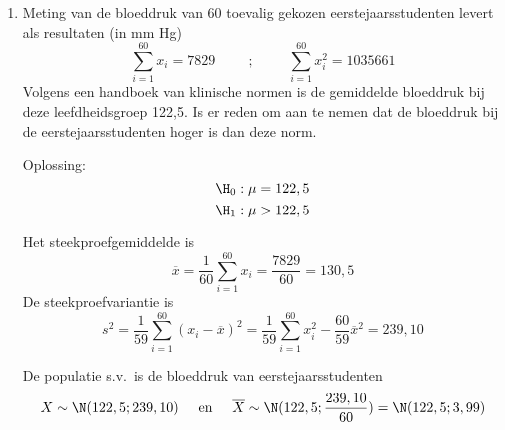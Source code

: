 {\begin{enumerate}
\begin{itemize}
\item Wat is de kans om, als de nulhypothese waar is, waarden te bekomen die even extreem of nog extremer zijn dan de observatie?
$$\P(\overline{X}\geq 118)=1-\P(\overline{X}\leq 118)=0,016<0,025$$
Deze kans noemen we de \textbf{$p$-waarde} (prob-value). Hier is de $p$-waarde kleiner dan 0,025. Dit betekent dat de observatie in het $5\%$ significantiegebied ligt. \\
Duid de $p$-waarde 0,016 aan op de voorgaande tekening.
\end{itemize}





Omdat het verwerpingsgebied  of het significantiegebied zich op de grafiek van de dichtheidsfunctie in de twee staarten van elk 
$2,5\%$ bevindt, zeggen we dat  we een \textbf{tweezijdige toets} hebben uitgevoerd. \\
De {\bf kritische punten} $c$ bij significantieniveau $5\%$ zijn de grenzen van het aanvaardingsgebied.
\begin{enumerate}
 \item Voor de standaardnormale kansverdeling zijn dat de waarden $-1,96$ en $1,96$;
\item voor de verdeling van het  intelligentiequoti\"ent zijn dat de waarden 112,3 en 117,7. 
\end{enumerate}

\item Meting van de bloeddruk van 60 toevalig gekozen eerstejaarsstudenten levert als resultaten (in mm Hg)
$$\sum_{i=1}^{60}x_i=7829\hspace{1cm};\hspace{1cm}\sum_{i=1}^{60}x_i^2=1035661$$
Volgens een handboek van klinische normen is de gemiddelde bloeddruk bij deze leefdheidsgroep 122,5. Is er reden om aan te nemen dat de bloeddruk bij de eerstejaarsstudenten hoger is dan deze norm.

{\sc Oplossing:} 
$$\H_0: \mu=122,5$$
$$\H_1:\mu>122,5$$

Het steekproefgemiddelde is
$$\overline{x}=\frac{1}{60}\sum_{i=1}^{60}x_i=\frac{7829}{60}=130,5$$
De steekproefvariantie is
$$s^2=\frac{1}{59}\sum_{i=1}^{60}(x_i-\overline{x})^2=\frac{1}{59}\sum_{i=1}^{60}x_i^2-\frac{60}{59}\overline{x}^2=239,10$$

De populatie s.v.\ is de bloeddruk van eerstejaarsstudenten
$$X\sim \N(122,5;239,10)\hspace{0,5cm}\mbox{en}\hspace{0,5cm}\overline{X}\sim \N(122,5;\frac{239,10}{60})=\N(122,5;3,99)$$


\end{enumerate}}
